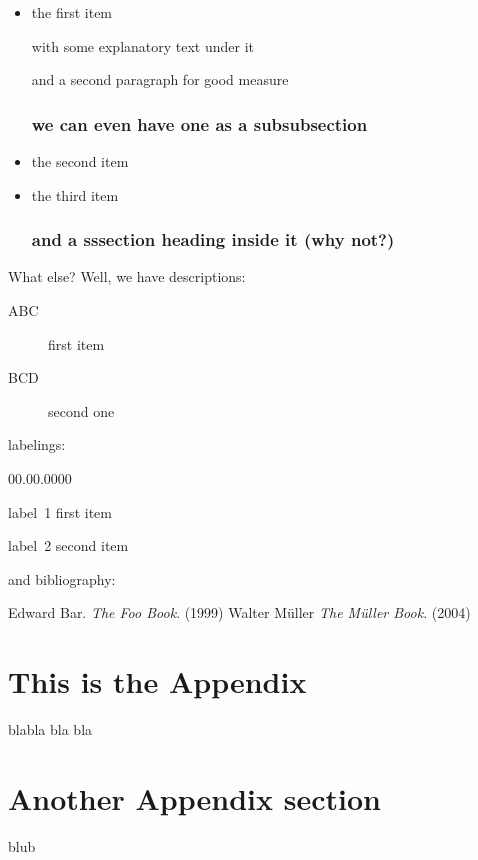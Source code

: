 \documentclass[legalpaper]{article}
\begin{document}
\begin{itemize}
\item the first item

with some explanatory text under it

and a second paragraph for good measure

\subsubsection*{we can even have one as a subsubsection}

\item the second item

\item the third item

\subsubsection*{and a sssection heading inside it (why not?)}
\end{itemize}

What else? Well, we have descriptions:
\begin{description}
\item[ABC] first item
\item[BCD] second one
\end{description}
labelings:
\begin{lyxlist}{00.00.0000}
\item [label~1] first item
\item [label~2] second item
\end{lyxlist}
and bibliography:
\begin{thebibliography}{9}
 Edward Bar. \emph{The Foo Book}. (1999)
 Walter Müller \emph{The Müller Book}. (2004) 
\end{thebibliography}

\appendix

\section{This is the Appendix}

\noindent blabla bla bla


\section{Another Appendix section}

blub
\end{document}
